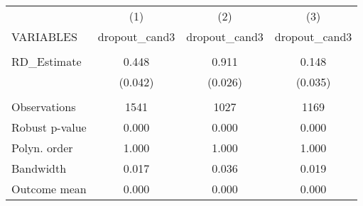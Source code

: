\documentclass[]{article}
\begin{document}
\begin{tabular}{lccc} \hline
 & (1) & (2) & (3) \\
VARIABLES & dropout\_cand3 & dropout\_cand3 & dropout\_cand3 \\ \hline
 &  &  &  \\
RD\_Estimate & 0.448 & 0.911 & 0.148 \\
 & (0.042) & (0.026) & (0.035) \\
 &  &  &  \\
Observations & 1541 & 1027 & 1169 \\
Robust p-value & 0.000 & 0.000 & 0.000 \\
Polyn. order & 1.000 & 1.000 & 1.000 \\
Bandwidth & 0.017 & 0.036 & 0.019 \\
 Outcome mean & 0.000 & 0.000 & 0.000 \\ \hline
\end{tabular}
\end{document}

